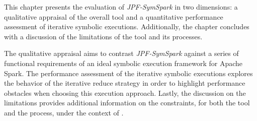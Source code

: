 
This chapter presents the evaluation of \textit{JPF-SymSpark} in two dimensions: a qualitative appraisal of the overall tool and a quantitative performance assessment of iterative symbolic executions. Additionally, the chapter concludes with a discussion of the limitations of the tool and its processes. 

The qualitative appraisal aims to contrast \textit{JPF-SymSpark} against a series of functional requirements of an ideal symbolic execution framework for Apache Spark. The performance assessment of the iterative symbolic executions explores the behavior of the iterative reduce strategy in order to highlight performance obstacles when choosing this execution approach. Lastly, the discussion on the limitations provides additional information on the constraints, for both the tool and the process, under the context of \jpf{}.




